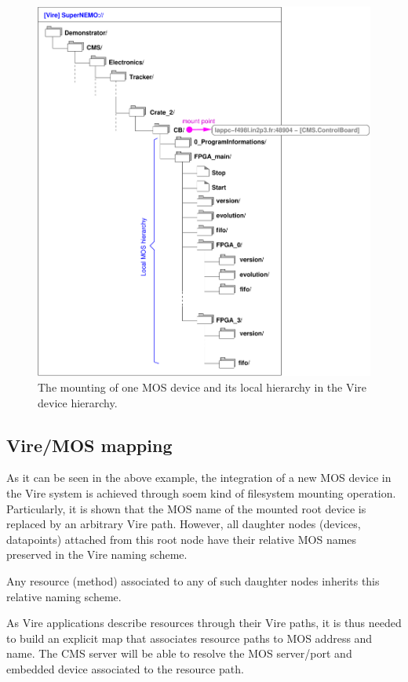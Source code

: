 \begin{figure}[h]
\begin{center}
\includegraphics[width=0.8\linewidth]{appendix/images/MOS_device_example_3.pdf}
\end{center}
\caption{The  mounting of  one  MOS device and its local hierarchy  in the  Vire
  device hierarchy.}\label{fig:an:mos_dev_3}
\end{figure}



\subsection{Vire/MOS mapping}

As it can be  seen in the above example, the integration  of a new MOS
device in the Vire system is  achieved through soem kind of filesystem
mounting operation.   Particularly, it is  shown that the MOS  name of
the   mounted  root   device  is   replaced  by   an  arbitrary   Vire
path. However, all daughter  nodes (devices, datapoints) attached from
this root  node have their  relative MOS  names preserved in  the Vire
naming scheme.

Any  resource  (method)  associated  to any  of  such  daughter  nodes
inherits this relative naming scheme.

As Vire applications  describe resources through their  Vire paths, it
is thus needed to build an explicit map that associates resource paths
to MOS address  and name. The CMS  server will be able  to resolve the
MOS server/port and  embedded device associated to  the resource path.

